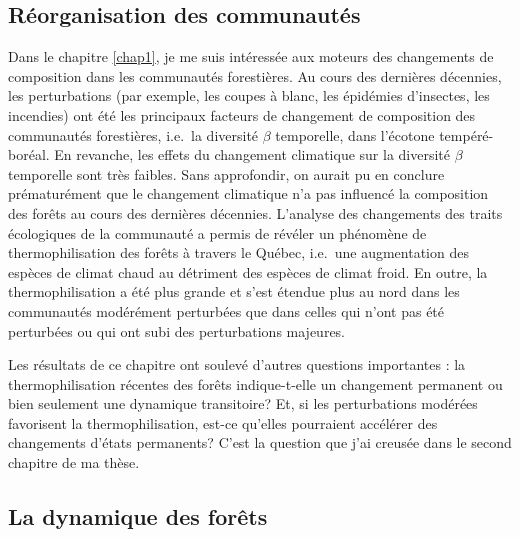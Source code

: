 \hypertarget{ruxe9organisation-des-communautuxe9s}{%
\subsection{Réorganisation des
communautés}\label{ruxe9organisation-des-communautuxe9s}}

Dans le chapitre \ref{chap1}, je me suis intéressée aux moteurs des
changements de composition dans les communautés forestières. Au cours
des dernières décennies, les perturbations (par exemple, les coupes à
blanc, les épidémies d'insectes, les incendies) ont été les principaux
facteurs de changement de composition des communautés forestières,
i.e.~la diversité \(\beta\) temporelle, dans l'écotone tempéré-boréal.
En revanche, les effets du changement climatique sur la diversité
\(\beta\) temporelle sont très faibles. Sans approfondir, on aurait pu
en conclure prématurément que le changement climatique n'a pas influencé
la composition des forêts au cours des dernières décennies. L'analyse
des changements des traits écologiques de la communauté a permis de
révéler un phénomène de thermophilisation des forêts à travers le
Québec, i.e.~une augmentation des espèces de climat chaud au détriment
des espèces de climat froid. En outre, la thermophilisation a été plus
grande et s'est étendue plus au nord dans les communautés modérément
perturbées que dans celles qui n'ont pas été perturbées ou qui ont subi
des perturbations majeures.

Les résultats de ce chapitre ont soulevé d'autres questions importantes
: la thermophilisation récentes des forêts indique-t-elle un changement
permanent ou bien seulement une dynamique transitoire? Et, si les
perturbations modérées favorisent la thermophilisation, est-ce qu'elles
pourraient accélérer des changements d'états permanents? C'est la
question que j'ai creusée dans le second chapitre de ma thèse.

\hypertarget{la-dynamique-des-foruxeats}{%
\subsection{La dynamique des forêts}\label{la-dynamique-des-foruxeats}}

